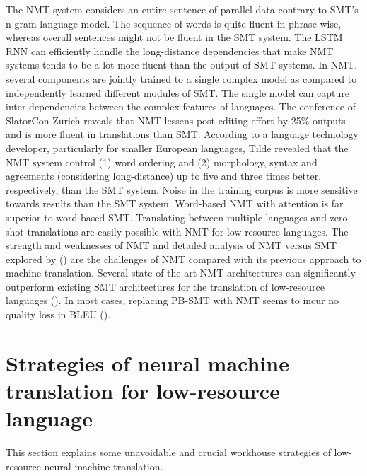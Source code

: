 \documentclass[manuscript,screen]{acmart}
\begin{document}
The NMT system considers an entire sentence of parallel data contrary to SMT's n-gram language model. The sequence of words is quite fluent in phrase wise, whereas overall sentences might not be fluent in the SMT system. The LSTM RNN can efficiently handle the long-distance dependencies that make NMT systems tends to be a lot more fluent than the output of SMT systems. In NMT, several components are jointly trained to a single complex model as compared to independently learned different modules of SMT. The single model can capture inter-dependencies between the complex features of languages. The conference of SlatorCon Zurich reveals that NMT lessens post-editing effort by 25\% outputs and is more fluent in translations than SMT. According to a language technology developer, particularly for smaller European languages, Tilde revealed that the NMT system control (1) word ordering and (2) morphology, syntax and agreements (considering long-distance) up to five and three times better, respectively, than the SMT system. Noise in the training corpus is more sensitive towards results than the SMT system. Word-based NMT with attention is far superior to word-based SMT. Translating between multiple languages and zero-shot translations are easily possible with NMT for low-resource languages.
The strength and weaknesses of NMT and detailed analysis of NMT versus SMT explored by (\citet{bentivogli2016neural,isabelle2017challenge,koehn2017six,mahata2018smt}) are the challenges of NMT compared with its previous approach to machine translation.
Several state-of-the-art NMT architectures can significantly outperform existing SMT architectures for the translation of low-resource languages (\citet{abbott2018towards, martinus2019focus}). In most cases, replacing PB-SMT with NMT seems to incur no quality loss in BLEU (\citet{junczys2016neural}).

\section{Strategies of neural machine translation for low-resource language}
\label{strategy}
This section explains some unavoidable and crucial workhouse strategies of low-resource neural machine translation.
\end{document}

